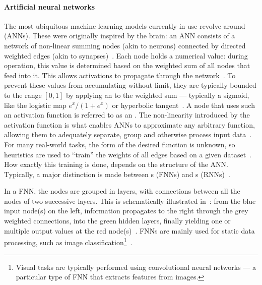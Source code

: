 \paragraph{Artificial neural networks}
The most ubiquitous machine learning models currently in use revolve around  (ANNs).
These were originally inspired by the brain: an ANN consists of a network of non-linear summing nodes (akin to neurons) connected by directed weighted edges (akin to synapses)~\cite{EvaluatingRestrictedESNs,zurada1992introduction,AIsimulateMemoryContinuity}.
Each node holds a numerical value: during operation, this value is determined based on the weighted sum of all nodes that feed into it.
This allows activations to propagate through the network~\cite{lukovsevivcius2009reservoir}.
To prevent these values from accumulating without limit, they are typically bounded to the range $[0,1]$ by applying an  to the weighted sum --- typically a sigmoid, like the logistic map $e^x/(1+e^x)$ or hyperbolic tangent~\cite{SurveyUniversalApproximation}.
A node that uses such an activation function is referred to as an .
The non-linearity introduced by the activation function is what enables ANNs to approximate any arbitrary function, allowing them to adequately separate, group and otherwise process input data~\cite{ApproximationFNN,SurveyUniversalApproximation,funahashi1992neural}.
For many real-world tasks, the form of the desired function is unknown, so heuristics are used to ``train'' the weights of all edges based on a given dataset~\cite{EvaluatingRestrictedESNs}.
How exactly this training is done, depends on the structure of the ANN.
Typically, a major distinction is made between s (FNNs) and s (RNNs)~\cite{ApproximationRNN}. \par
In a FNN, the nodes are grouped in layers, with connections between all the nodes of two successive layers.
This is schematically illustrated in~: from the blue input node(s) on the left, information propagates to the right through the grey weighted connections, into the green hidden layers, finally yielding one or multiple output values at the red node(s)~\cite{zurada1992introduction}.
FNNs are mainly used for static data processing, such as image classification\footnote{Visual tasks are typically performed using convolutional neural networks --- a particular type of FNN that extracts features from images.}~\cite{ApproximationRNN}.
